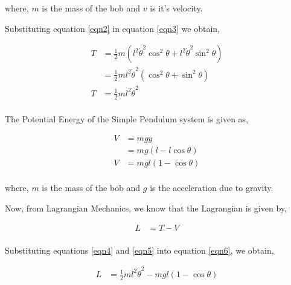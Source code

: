 \documentclass[12pt]{article}
\begin{document}
where, $m$ is the mass of the bob and $v$ is it's velocity.

\newpage

Substituting equation \ref{eqn2} in equation \ref{eqn3} we obtain,

\begin{equation} \label{eqn4}
    \begin{split}
        T &= \frac{1}{2} m ( l^{2} \dot{\theta}^{2} \cos^{2}{\theta} + l^{2} \dot{\theta}^{2} \sin^{2}{\theta} ) \\
        &= \frac{1}{2} m  l^{2} \dot{\theta}^{2} ( \cos^{2}{\theta} + \sin^{2}{\theta} ) \\
        T &= \frac{1}{2} m  l^{2} \dot{\theta}^{2} \\
    \end{split}
\end{equation}

The Potential Energy of the Simple Pendulum system is given as,

\begin{equation} \label{eqn5}
    \begin{split}
        V &= mgy \\
        &= mg ( l - l\cos{\theta} ) \\
        V &= mgl ( 1 - \cos{\theta} ) \\
    \end{split}
\end{equation}

where, $m$ is the mass of the bob and $g$ is the acceleration due to gravity.

Now, from Lagrangian Mechanics, we know that the Lagrangian is given by,

\begin{equation} \label{eqn6}
    \begin{split}
       L &= T - V \\
    \end{split}
\end{equation}

Substituting equations \ref{eqn4} and \ref{eqn5} into equation \ref{eqn6}, we obtain,

\begin{equation} \label{eqn7}
    \begin{split}
        L &= \frac{1}{2} m  l^{2} \dot{\theta}^{2} - mgl ( 1 - \cos{\theta} ) \\
    \end{split}
\end{equation}
\end{document}
